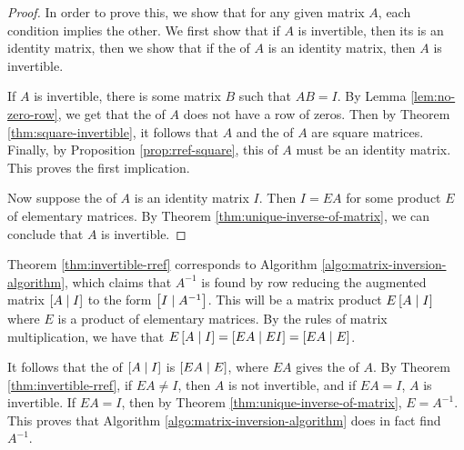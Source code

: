 \begin{proof}
In order to prove this, we show that for any given matrix $A$, each condition implies the other. We first show that if $A$ is invertible, then its {\rref} is an identity matrix, then we show that if the {\rref} of $A$ is an identity matrix, then $A$ is invertible. 

If $A$ is invertible, there is some matrix $B$ such that $AB = I$. By Lemma \ref{lem:no-zero-row}, we get that the {\rref} of $A$ does not have a row of zeros. Then by Theorem \ref{thm:square-invertible}, it follows that $A$ and the {\rref} of $A$ are square matrices. Finally, by Proposition \ref{prop:rref-square}, this {\rref} of $A$ must be an identity matrix. This proves the first implication.

Now suppose the {\rref} of $A$ is an identity matrix $I$. Then $I=EA$ for some product $E$ of elementary matrices. By Theorem \ref{thm:unique-inverse-of-matrix}, we can conclude that $A$ is invertible.
\end{proof}

Theorem \ref{thm:invertible-rref} corresponds to Algorithm \ref{algo:matrix-inversion-algorithm}, which claims that $A^{-1}$ is found by row reducing the augmented matrix $\left[A\mid I\right]$ to the form $\left[I\mid A^{-1}\right]$. This will be a matrix product $E\left[A\mid I\right]$ where $E$ is a product of elementary matrices. By the rules of matrix multiplication, we have that $E\left[A\mid I\right] = \left[EA\mid EI\right] = \left[EA\mid E\right]$.

It follows that the {\rref} of $\left[A\mid I\right]$ is $\left[EA\mid E\right]$, where $EA$ gives the {\rref} of $A$. By Theorem \ref{thm:invertible-rref}, if $EA \neq I$, then $A$ is not invertible, and if $EA=I$, $A$ is invertible. If $EA=I$, then by Theorem \ref{thm:unique-inverse-of-matrix}, $E=A^{-1}$. This proves that Algorithm \ref{algo:matrix-inversion-algorithm} does in fact find $A^{-1}$.
